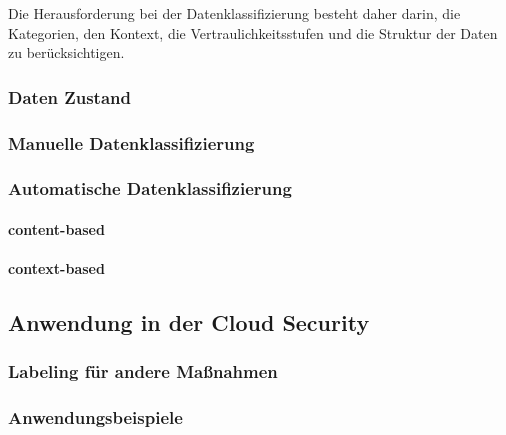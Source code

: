 Die Herausforderung bei der Datenklassifizierung besteht daher darin, die Kategorien, den Kontext, die Vertraulichkeitsstufen und die Struktur der Daten zu berücksichtigen.

\subsubsection{Daten Zustand}

\subsubsection{Manuelle Datenklassifizierung}


\subsubsection{Automatische Datenklassifizierung}



\paragraph{content-based}

\paragraph{context-based}



\subsection{Anwendung in der Cloud Security}

\subsubsection{Labeling für andere Maßnahmen}

\subsubsection{Anwendungsbeispiele}
